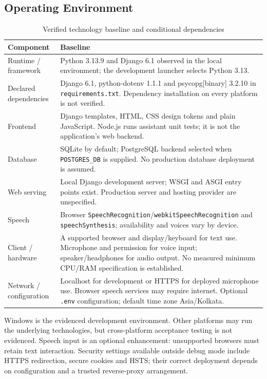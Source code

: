 \documentclass{article}
\begin{document}
\subsection{Operating Environment}
\begin{table}[H]
\centering\small
\caption{Verified technology baseline and conditional dependencies}
\begin{tabularx}{\textwidth}{L{37mm}Y}
\toprule Component & Baseline\\\midrule
Runtime / framework & Python 3.13.9 and Django 6.1 observed in the local environment; the development launcher selects Python 3.13.\\
Declared dependencies & Django 6.1, python-dotenv 1.1.1 and psycopg[binary] 3.2.10 in \texttt{requirements.txt}. Dependency installation on every platform is not verified.\\
Frontend & Django templates, HTML, CSS design tokens and plain JavaScript. Node.js runs assistant unit tests; it is not the application's web backend.\\
Database & SQLite by default; PostgreSQL backend selected when \texttt{POSTGRES\_DB} is supplied. No production database deployment is assumed.\\
Web serving & Local Django development server; WSGI and ASGI entry points exist. Production server and hosting provider are unspecified.\\
Speech & Browser \texttt{SpeechRecognition}/\texttt{webkitSpeechRecognition} and \texttt{speechSynthesis}; availability and voices vary by device.\\
Client / hardware & A supported browser and display/keyboard for text use. Microphone and permission for voice input; speaker/headphones for audio output. No measured minimum CPU/RAM specification is established.\\
Network / configuration & Localhost for development or HTTPS for deployed microphone use. Browser speech services may require internet. Optional \texttt{.env} configuration; default time zone Asia/Kolkata.\\
\bottomrule
\end{tabularx}
\end{table}
Windows is the evidenced development environment. Other platforms may run the underlying technologies, but cross-platform acceptance testing is not evidenced. Speech input is an optional enhancement: unsupported browsers must retain text interaction. Security settings available outside debug mode include HTTPS redirection, secure cookies and HSTS; their correct deployment depends on configuration and a trusted reverse-proxy arrangement.
\end{document}
